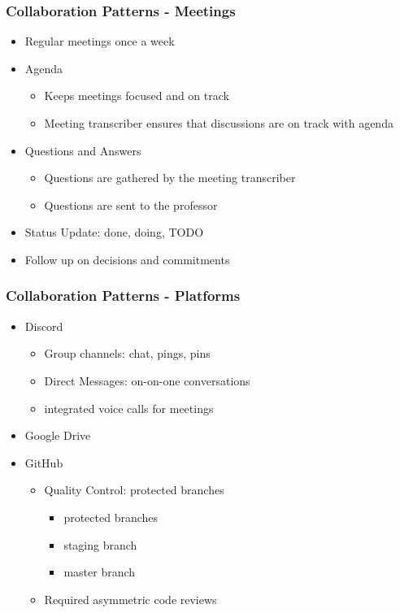 \documentclass{beamer}
\begin{document}
  \begin{frame}
  \frametitle{Collaboration Patterns - Meetings}
  \begin{itemize}
   \item Regular meetings once a week
   \item Agenda
     \begin{itemize}
     \item Keeps meetings focused and on track
     \item Meeting transcriber ensures that discussions are on track with agenda
     \end{itemize}
   \item Questions and Answers
      \begin{itemize}
     \item Questions are gathered by the meeting transcriber
     \item Questions are sent to the professor
     \end{itemize}
   \item Status Update: done, doing, TODO
   \item Follow up on decisions and commitments
  \end{itemize}
  \end{frame}

  \begin{frame}
  \frametitle{Collaboration Patterns - Platforms}
  \begin{itemize}
   \item Discord
    \begin{itemize}
     \item Group channels: chat, pings, pins
     \item Direct Messages: on-on-one conversations
     \item integrated voice calls for meetings
    \end{itemize}
   \item Google Drive
   \item GitHub
    \begin{itemize}
     \item Quality Control: protected branches
       \begin{itemize}
          \item protected branches
          \item staging branch
          \item master branch
      \end{itemize}
     \item Required asymmetric code reviews
    \end{itemize}
  \end{itemize}
  \end{frame}
\end{document}
